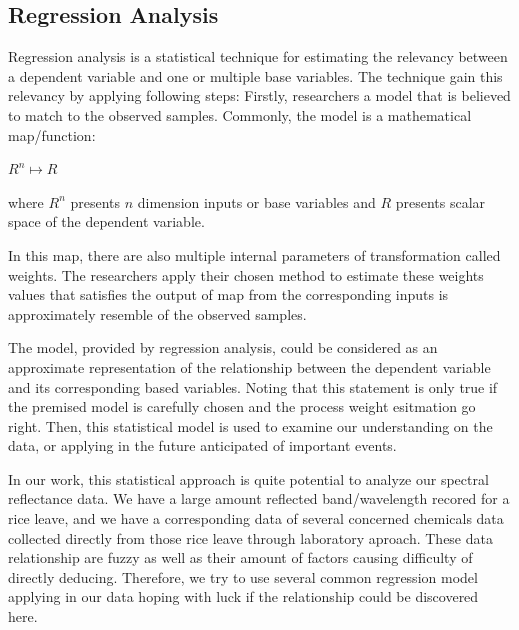 \subsection{Regression Analysis}

Regression analysis is a statistical technique for estimating
the relevancy between a dependent variable and one or multiple base variables.
The technique gain this relevancy by applying following steps:
Firstly, researchers a model that is believed to match to the observed samples.
Commonly, the model is a mathematical map/function:

\begin{center}
    $R^{n} \mapsto R$
\end{center}

where $R^{n}$ presents $n$ dimension inputs or base variables
and $R$ presents scalar space of the dependent variable.

In this map, there are also multiple internal parameters of transformation called weights.
The researchers apply their chosen method to estimate these weights values
that satisfies the output of map from the corresponding inputs is approximately resemble of the observed samples.

The model, provided by regression analysis, could be considered as an approximate representation
of the relationship between the dependent variable and its corresponding based variables.
Noting that this statement is only true if the premised model is carefully chosen
and the process weight esitmation go right.
Then, this statistical model is used to examine our understanding on the data,
or applying in the future anticipated of important events.

In our work, this statistical approach is quite potential to analyze our spectral reflectance data.
We have a large amount reflected band/wavelength recored for a rice leave,
and we have a corresponding data of several concerned chemicals data collected directly
from those rice leave through laboratory aproach.
These data relationship are fuzzy
as well as their amount of factors causing difficulty of directly deducing.
Therefore, we try to use several common regression model applying in our data
hoping with luck if the relationship could be discovered here.

